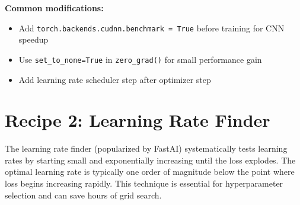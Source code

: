 \documentclass[../main.tex]{subfiles}
\begin{document}
\textbf{Common modifications:}
\begin{itemize}
    \item Add \texttt{torch.backends.cudnn.benchmark = True} before training for CNN speedup
    \item Use \texttt{set\_to\_none=True} in \texttt{zero\_grad()} for small performance gain
    \item Add learning rate scheduler step after optimizer step
\end{itemize}

\section{Recipe 2: Learning Rate Finder}\label{sec:recipe-lr-finder}

The learning rate finder (popularized by FastAI) systematically tests learning rates by starting small and exponentially increasing until the loss explodes. The optimal learning rate is typically one order of magnitude below the point where loss begins increasing rapidly. This technique is essential for hyperparameter selection and can save hours of grid search.
\end{document}
